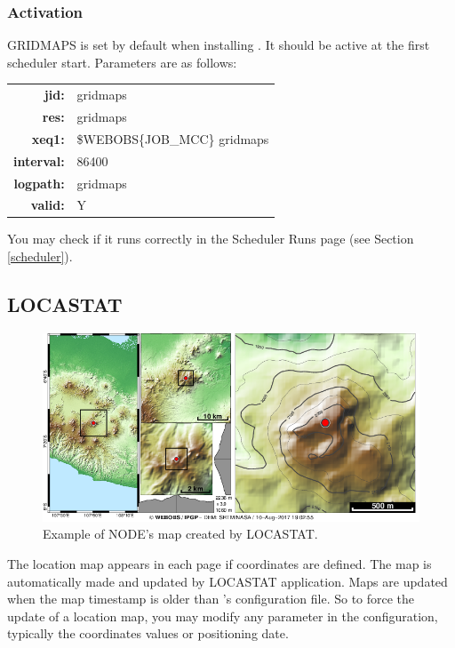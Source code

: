 \subsubsection{Activation}

GRIDMAPS is set by default when installing \webobs. It should be active at the first scheduler start. Parameters are as follows:

\begin{tabular}{rl}
\textbf{jid:}      & gridmaps \\
\textbf{res:}      & gridmaps \\
\textbf{xeq1:}     & \$WEBOBS\{JOB\_MCC\} gridmaps \\
\textbf{interval:} & 86400 \\
\textbf{logpath:}  & gridmaps \\
\textbf{valid:}    & Y \\
\end{tabular}

You may check if it runs correctly in the Scheduler Runs page (see Section \ref{scheduler}).


\subsection{LOCASTAT}
\label{locastat}

\begin{figure}
\includegraphics[width=\textwidth]{figures/IAIOBSPC01_map.png}
\caption{Example of NODE's map created by LOCASTAT.}
\end{figure}

The location map appears in each  page if coordinates are defined. The map is automatically made and updated by LOCASTAT application. Maps are updated when the map timestamp is older than 's configuration file. So to force the update of a location map, you may modify any parameter in the  configuration, typically the coordinates values or positioning date. 

